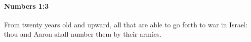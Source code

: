 
		\paragraph{Numbers 1:3} %
			\label{NUMBERS-1-3}

			From twenty years old and upward, all that are able to go forth to war in Israel: thou and Aaron shall number them by their armies.



